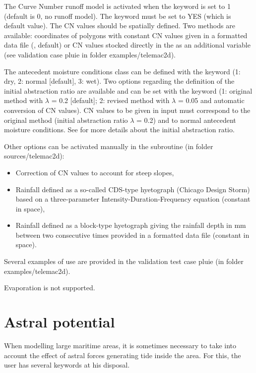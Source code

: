 The Curve Number runoff model is activated when the keyword
 is set to 1 (default is 0, no runoff model).
The keyword  must be set to YES (which is default value).
The CN values should be spatially defined.
Two methods are available: coordinates of polygons with constant CN values
given in a formatted data file (, default)
or CN values stocked directly in the  as
an additional variable (see validation case pluie in folder examples/telemac2d).

The antecedent moisture conditions class can be defined with the keyword
 (1: dry, 2: normal [default], 3: wet).
Two options regarding the definition of the initial abstraction ratio are
available
and can be set with the keyword 
(1: original method with $\lambda$ = 0.2 [default];
 2: revised method with $\lambda$ = 0.05 and automatic conversion of CN values).
CN values to be given in input must correspond to the original method
(initial abstraction ratio $\lambda$ = 0.2) and to normal antecedent moisture
conditions. See \cite{woodward2003runoff} for more details about the initial
abstraction ratio.

Other options can be activated manually in the 
subroutine (in folder sources/telemac2d):
\begin{itemize}
\item Correction of CN values to account for steep slopes,
\item Rainfall defined as a so-called CDS-type hyetograph (Chicago Design
Storm) based on a three-parameter Intensity-Duration-Frequency equation
(constant in space),
\item Rainfall defined as a block-type hyetograph giving the rainfall depth
in mm between two consecutive times provided in a formatted data file (constant
in space).
\end{itemize}
Several examples of use are provided in the validation test case pluie
(in folder examples/telemac2d).

Evaporation is not supported.


\section{Astral potential}
\label{sec:astral:pot}
When modelling large maritime areas, it is sometimes necessary to take into
account the effect of astral forces generating tide inside the area.
For this, the user has several keywords at his disposal.

